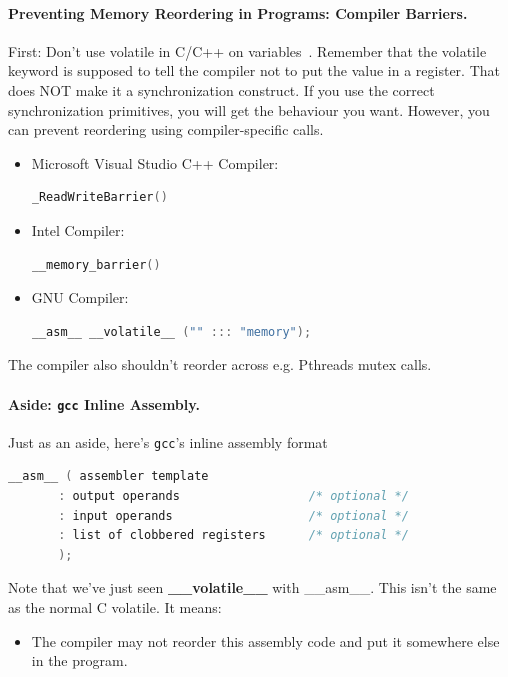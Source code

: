 \documentclass[a4paper]{report}
\begin{document}
\paragraph{Preventing Memory Reordering in Programs: Compiler Barriers.}
First: Don't use volatile in C/C++ on variables~\cite{so:volatile}. Remember that the volatile keyword is supposed to tell the compiler not to put the value in a register. That does NOT make it a synchronization construct. If you use the correct synchronization primitives, you will get the behaviour you want. However, you can prevent reordering using compiler-specific calls.

\begin{itemize}
  \item Microsoft Visual Studio C++ Compiler:
  \begin{lstlisting}[language=C]
_ReadWriteBarrier()
  \end{lstlisting}
  \item Intel Compiler:
  \begin{lstlisting}[language=C]
    __memory_barrier()
  \end{lstlisting}
  \item GNU Compiler:
  \begin{lstlisting}[language=C]
__asm__ __volatile__ ("" ::: "memory");
  \end{lstlisting}
\end{itemize}

The compiler also shouldn't reorder across e.g. Pthreads mutex calls.

\paragraph{Aside: {\tt gcc} Inline Assembly.}
Just as an aside, here's {\tt gcc}'s inline assembly format

  \begin{lstlisting}[language=C]
__asm__ ( assembler template 
       : output operands                  /* optional */
       : input operands                   /* optional */
       : list of clobbered registers      /* optional */
       );
  \end{lstlisting}

Note that we've just seen {\bf \_\_volatile\_\_} with  \_\_asm\_\_. This isn't the same as the normal C volatile. It means:
\begin{itemize}
    \item The compiler may not reorder this assembly code and put it somewhere
      else in the program.
\end{itemize}
\end{document}
